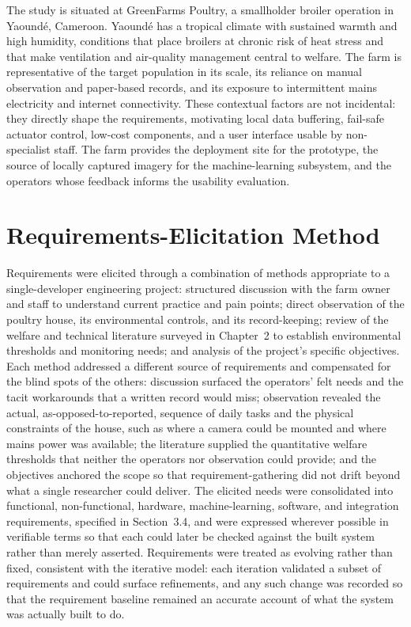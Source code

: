 \documentclass[12pt,a4paper]{report}
\begin{document}
The study is situated at GreenFarms Poultry, a smallholder broiler operation in Yaound\'e, Cameroon. Yaound\'e has a tropical climate with sustained warmth and high humidity, conditions that place broilers at chronic risk of heat stress and that make ventilation and air-quality management central to welfare. The farm is representative of the target population in its scale, its reliance on manual observation and paper-based records, and its exposure to intermittent mains electricity and internet connectivity. These contextual factors are not incidental: they directly shape the requirements, motivating local data buffering, fail-safe actuator control, low-cost components, and a user interface usable by non-specialist staff. The farm provides the deployment site for the prototype, the source of locally captured imagery for the machine-learning subsystem, and the operators whose feedback informs the usability evaluation.

\section{Requirements-Elicitation Method}

Requirements were elicited through a combination of methods appropriate to a single-developer engineering project: structured discussion with the farm owner and staff to understand current practice and pain points; direct observation of the poultry house, its environmental controls, and its record-keeping; review of the welfare and technical literature surveyed in Chapter~2 to establish environmental thresholds and monitoring needs; and analysis of the project's specific objectives. Each method addressed a different source of requirements and compensated for the blind spots of the others: discussion surfaced the operators' felt needs and the tacit workarounds that a written record would miss; observation revealed the actual, as-opposed-to-reported, sequence of daily tasks and the physical constraints of the house, such as where a camera could be mounted and where mains power was available; the literature supplied the quantitative welfare thresholds that neither the operators nor observation could provide; and the objectives anchored the scope so that requirement-gathering did not drift beyond what a single researcher could deliver. The elicited needs were consolidated into functional, non-functional, hardware, machine-learning, software, and integration requirements, specified in Section~3.4, and were expressed wherever possible in verifiable terms so that each could later be checked against the built system rather than merely asserted. Requirements were treated as evolving rather than fixed, consistent with the iterative model: each iteration validated a subset of requirements and could surface refinements, and any such change was recorded so that the requirement baseline remained an accurate account of what the system was actually built to do.
\end{document}
